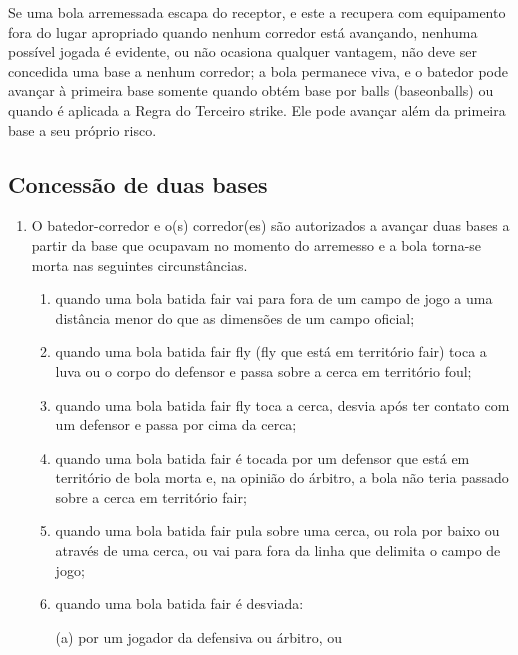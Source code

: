 \begin{enumerate}[label=\roman*.]
\begin{enumerate}[label=\arabic*)]
			  Se uma bola arremessada escapa do receptor, e este a recupera com equipamento fora do lugar apropriado quando nenhum corredor está avançando, nenhuma possível jogada é evidente, ou não ocasiona qualquer vantagem, não deve ser concedida uma base a nenhum corredor; a bola permanece viva, e o batedor pode avançar à primeira base somente quando obtém base por \glspl{ball} (\gls{baseonballs}) ou quando é aplicada a Regra do Terceiro \gls{strike}. Ele pode avançar além da primeira base a seu próprio risco.
		\end{enumerate}

\subsection{Concessão de duas bases}

	\begin{enumerate}[label=\roman*.]
	\item O batedor-corredor e o(s) corredor(es) são autorizados a avançar duas bases a partir da base que ocupavam no momento do arremesso e a bola torna-se morta nas seguintes circunstâncias.

	 \begin{enumerate}[label=\arabic*)]
		 	\item quando uma bola batida \gls{fair} vai para fora de um campo de jogo a uma  distância menor do que as dimensões de um campo oficial;
			\item  quando uma bola batida \gls{fair fly} (\gls{fly} que está em território \gls{fair}) toca a luva ou o corpo do defensor e passa sobre a cerca em território \gls{foul};
			\item  quando uma bola batida \gls{fair fly} toca a cerca, desvia após ter contato com  um defensor e passa por cima da cerca;
			\item  quando uma bola batida \gls{fair} é tocada por um defensor que está em território de bola morta e, na opinião do árbitro, a bola não teria passado sobre a cerca em território \gls{fair};
			\item  quando uma bola batida \gls{fair} pula sobre uma cerca, ou rola por baixo ou através de uma cerca, ou vai para fora da linha que delimita o campo de jogo;
			\item  quando uma bola batida \gls{fair} é desviada:

				(a) por um jogador da defensiva ou árbitro, ou


\end{enumerate}
\end{enumerate}
\end{enumerate}
